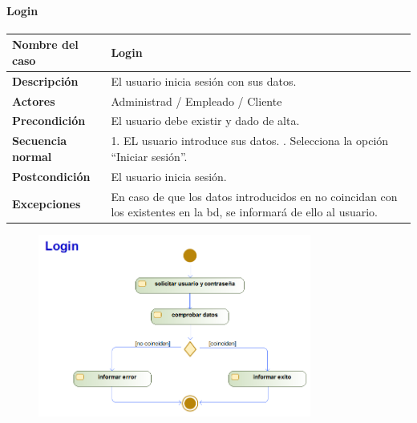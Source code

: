 \paragraph{Login}
\begin{table}[H]
    \centering
    \small
    \begin{tabularx}{0.8\textwidth}{|p{3.5cm}|X|}
        \hline
        \rowcolor{lightgray}
        \textbf{Nombre del caso}  & \textbf{Login}                                                                                                            \\
        \hline
        \textbf{Descripción}      & El usuario inicia sesión con sus datos.                                                                                   \\
        \hline
        \textbf{Actores}          & Administrad / Empleado / Cliente                                                                                          \\
        \hline
        \textbf{Precondición}     & El usuario debe existir y dado de alta.                                                                                   \\
        \hline
        \textbf{Secuencia normal} & 1. EL usuario introduce sus datos. \newline
        2. Selecciona la opción ``Iniciar sesión''. \newline                                                                                                  \\
        \hline
        \textbf{Postcondición}    & El usuario inicia sesión.                                                                                                 \\
        \hline
        \textbf{Excepciones}      & En caso de que los datos introducidos en no coincidan con los existentes en la \gls{bd}, se informará de ello al usuario. \\
        \hline
    \end{tabularx}
\end{table}
\begin{figure}[H]
    \centering
    \includegraphics[width=0.8\textwidth]{Use_Cases/login.png}
\end{figure}
\newpage
